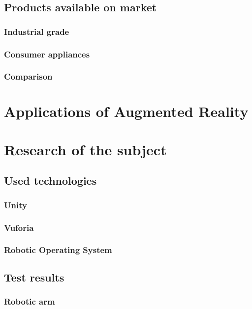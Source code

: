 \documentclass[printmode,en]{mgr}
\begin{document}
\section{Products available on market}

\subsection{Industrial grade}

\subsection{Consumer appliances}

\subsection{Comparison}

\chapter{Applications of Augmented Reality}


\chapter{Research of the subject}

\section{Used technologies}

\subsection{Unity}

\subsection{Vuforia}

\subsection{Robotic Operating System}

\section{Test results}

\subsection{Robotic arm}
\end{document}
